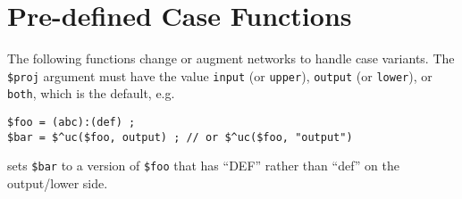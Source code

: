 \chapter{Pre-defined Case Functions}


The following functions change or augment networks to handle case
variants.  The \verb!$proj! argument must have the value \texttt{input}
(or \texttt{upper}), \texttt{output} (or \texttt{lower}), or
\texttt{both}, which is the default, e.g.

\begin{Verbatim}[fontsize=\small]
$foo = (abc):(def) ;
$bar = $^uc($foo, output) ; // or $^uc($foo, "output")
\end{Verbatim}

\noindent
sets \verb!$bar! to a version of \verb!$foo! that has ``DEF'' rather than
``def'' on the output/lower side.

\vspace{0.5cm}

